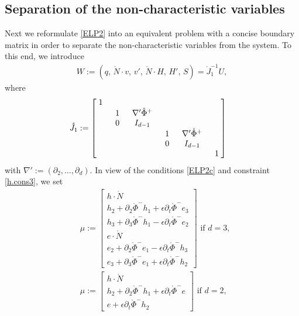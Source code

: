 \documentclass[twoside,11pt]{article}
\numberwithin{equation}{section}
\def\p{\partial}
\newcommand\w[1]{\makebox[1em]{$#1$}}
\begin{document}
	\subsection{Separation of the non-characteristic variables}
	Next we reformulate \eqref{ELP2} into an equivalent problem with a concise boundary matrix in order to separate the non-characteristic variables from the system.
	To this end, we introduce
	\begin{align}
		\label{W:def}
		W:= (q,\, \mathring{N}\cdot v,\, v',\, \mathring{N}\cdot H, \, H',\, S) =\mathring{J}_1^{-1}U
 ,
	\end{align}
	where
	\begin{align}
		\label{J1.ring:def}
		&\mathring{J}_1:=
		\begin{bmatrix}
			\;1 \;&   & & & &  \\
			&\; 1\; & \;\nabla' {\mathring{\Phi}^+} \;       &  & & \\
			& 0 & I_{d-1}        & & & \\
			&  &      & \;1 \;&\;\nabla' {\mathring{\Phi}^+} \;    & \\
			&  &      & 0 & I_{d-1}  & \\
			&  &  &  &    & \w{\;1\;}
		\end{bmatrix}
	\end{align}
	with $\nabla':=(\p_2,\ldots,\p_d)$.
	In view of the conditions \eqref{ELP2c} and constraint \eqref{h.cons3}, we set %
	\begin{align}	
&\mu:=\begin{bmatrix}
			h\cdot\mathring{N}\\[0.5mm]
			h_2+\p_2\mathring{\Phi}^-h_1+\epsilon  \p_t\mathring{\Phi}^- e_3 \\[0.5mm]
			h_3+\p_3\mathring{\Phi}^-h_1-\epsilon  \p_t\mathring{\Phi}^- e_2 \\[0.5mm]
			e\cdot\mathring{N}\\[0.5mm]
			e_2+\p_2\mathring{\Phi}^-e_1-\epsilon  \p_t\mathring{\Phi}^- h_3 \\[0.5mm]
			e_3+\p_3\mathring{\Phi}^-e_1+\epsilon  \p_t\mathring{\Phi}^- h_2
		\end{bmatrix}
 \textrm{ if }d=3,	\label{mu:def1.3D}
	\\[1mm]
&\mu:=\begin{bmatrix}
	h\cdot\mathring{N}\\[0.5mm]
	h_2+\p_2\mathring{\Phi}^-h_1+\epsilon  \p_t\mathring{\Phi}^- e \\[0.5mm]
	e+\epsilon \p_t\mathring{\Phi}^- h_2
\end{bmatrix}	
 \textrm{ if }d=2,
	\label{mu:def1}
	\end{align}
\end{document}
